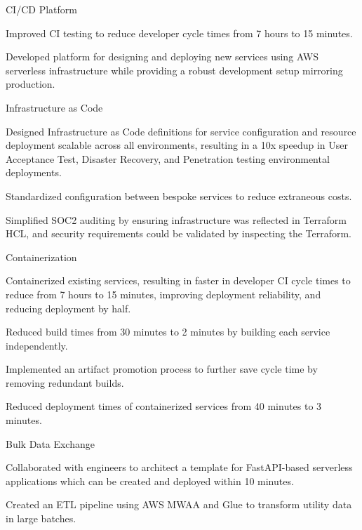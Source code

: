 \begin{cventries}
  \cventry
    {} {CI/CD Platform} {} {} {
      \begin{cvitems}
        \item {Improved CI testing to reduce developer cycle times from 7 hours to 15 minutes.}
        \item {Developed platform for designing and deploying new services using AWS serverless infrastructure while providing a robust development setup mirroring production.}
      \end{cvitems}
    }
  \cventry
    {} {Infrastructure as Code} {} {} {
      \begin{cvitems}
        \item {Designed Infrastructure as Code definitions for service configuration and resource deployment scalable across all environments, resulting in a 10x speedup in User Acceptance Test, Disaster Recovery, and Penetration testing environmental deployments.}
        \item {Standardized configuration between bespoke services to reduce extraneous costs.}
        \item {Simplified SOC2 auditing by ensuring infrastructure was reflected in Terraform HCL, and security requirements could be validated by inspecting the Terraform.}
      \end{cvitems}
    }
  \cventry
    {} {Containerization} {} {} {
      \begin{cvitems}
        \item {Containerized existing services, resulting in faster in developer CI cycle times to reduce from 7 hours to 15 minutes, improving deployment reliability, and reducing deployment by half.}
        \item {Reduced build times from 30 minutes to 2 minutes by building each service independently.}
        \item {Implemented an artifact promotion process to further save cycle time by removing redundant builds.}
        \item {Reduced deployment times of containerized services from 40 minutes to 3 minutes.}
      \end{cvitems}
    }
  \cventry
    {} {Bulk Data Exchange} {} {} {
      \begin{cvitems}
        \item {Collaborated with engineers to architect a template for FastAPI-based serverless applications which can be created and deployed within 10 minutes.}
        \item {Created an ETL pipeline using AWS MWAA and Glue to transform utility data in large batches.}

\end{cvitems}}
\end{cventries}
